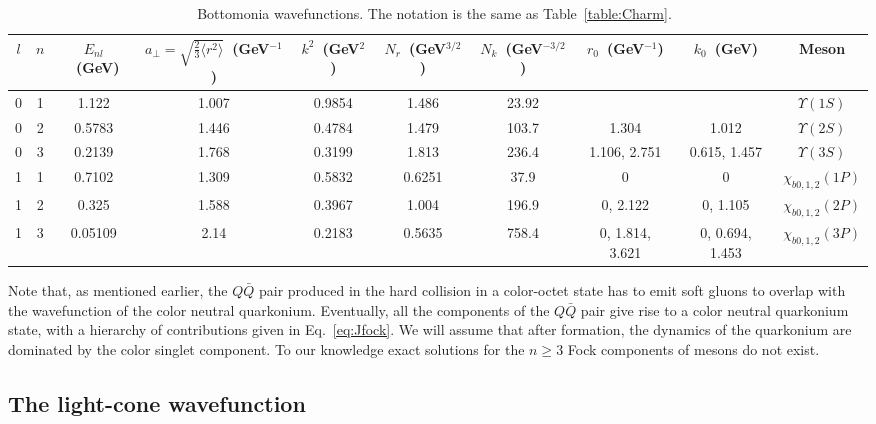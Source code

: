 \documentclass[article,showpacs,preprintnumbers,amsmath,amssymb]{revtex4}
\newcommand{\barQ}{{\bar{Q}}}
\begin{document}
\begin{table}[h]
\begin{tabular}{cccccccccc}
 $l$ & $n$ & $E_{nl}$~(GeV) & $a_\perp=\sqrt{\frac{2}{3}\langle r^2\rangle}$~(GeV$^{-1}$) & $k^2$~(GeV$^2$) & $N_r$~(GeV$^{3/2}$)  & $N_k$~(GeV$^{-3/2}$) & ${r_0}$~(GeV$^{-1}$) & ${k_0}$~(GeV)     & Meson\\ 
 \hline \hline
 0  & 1  & 1.122     & 1.007           & 0.9854         & 1.486               & 23.92                 & { }                 & { }               & $\Upsilon(1S)$\\
 0  & 2  & 0.5783    & 1.446           & 0.4784         & 1.479               & 103.7                 & {   1.304}          & {   1.012}        & $\Upsilon(2S)$\\
 0  & 3  & 0.2139    & 1.768           & 0.3199         & 1.813               & 236.4                 & {   1.106, 2.751}   & {   0.615, 1.457} & $\Upsilon(3S)$\\
 1  & 1  & 0.7102    & 1.309           & 0.5832         & 0.6251              & 37.9                  & {0}                 & {0}               & $\chi_{b0,1,2}(1P)$\\
 1  & 2  & 0.325     & 1.588           & 0.3967         & 1.004               & 196.9                 & {0, 2.122}          & {0, 1.105}        & $\chi_{b0,1,2}(2P)$\\
 1  & 3  & 0.05109   & 2.14            & 0.2183         & 0.5635              & 758.4                 & {0, 1.814, 3.621}   & {0, 0.694, 1.453} & $\chi_{b0,1,2}(3P)$\\
\end{tabular}
\caption{Bottomonia wavefunctions. The notation is the same as Table~\ref{table:Charm}.~\label{table:Bottom}}
\end{table}


Note that, as mentioned earlier, the $Q\barQ$ pair produced in the hard
collision in a color-octet state has to emit soft gluons to overlap with the
wavefunction of the color neutral quarkonium. Eventually, all the components of
the $Q\barQ$ pair give rise to a color neutral quarkonium state, with a
hierarchy of contributions given in Eq.~\ref{eq:Jfock}. We will assume that after
formation, the dynamics of the quarkonium are dominated by the color singlet 
component. To our knowledge
exact solutions for  the $n\geq 3$ Fock components of mesons do not exist.
   


\subsection{The light-cone wavefunction}
\end{document}
